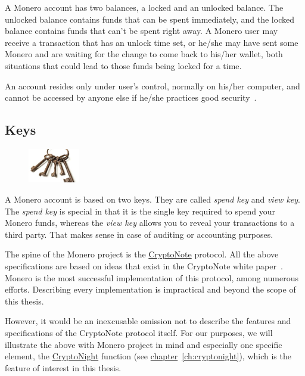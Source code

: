 A Monero account has two balances, a locked and an unlocked balance. The unlocked balance contains funds that can be spent immediately, and the locked balance contains funds that can't be spent right away. A Monero user may receive a transaction that has an unlock time set, or he/she may have sent some Monero and are waiting for the change to come back to his/her wallet, both situations that could lead to those funds being locked for a time.

An account resides only under user's control, normally on his/her computer, and cannot be accessed by anyone else if he/she practices good security~\cite{getmonero}.

\subsection{Keys}
\begin{figure}
\centering
\includegraphics[width=0.2\textwidth]{Images/Monero/keys.jpg}
\end{figure}
A Monero account is based on two keys. They are called \emph{spend key} and \emph{view key}. The \emph{spend key} is special in that it is the single key required to spend your Monero funds, whereas the \emph{view key} allows you to reveal your transactions to a third party. That makes sense in case of auditing or accounting purposes.
\vspace{0.8cm}

The spine of the Monero project is the \hyperref[sec:CryptoNote]{CryptoNote} protocol. All the above specifications are based on ideas that exist in the CryptoNote white paper~\cite{citeulike:14139412}. Monero is the most successful implementation of this protocol, among numerous efforts. Describing every implementation is impractical and beyond the scope of this thesis.

However, it would be an inexcusable omission not to describe the features and specifications of the CryptoNote protocol itself. For our purposes, we will illustrate the above with Monero project in mind and especially one specific element, the \hyperref[ch:cryptonight]{CryptoNight} function (see \hyperref[ch:cryptonight]{chapter}~\ref{ch:cryptonight}), which is the feature of interest in this thesis.

